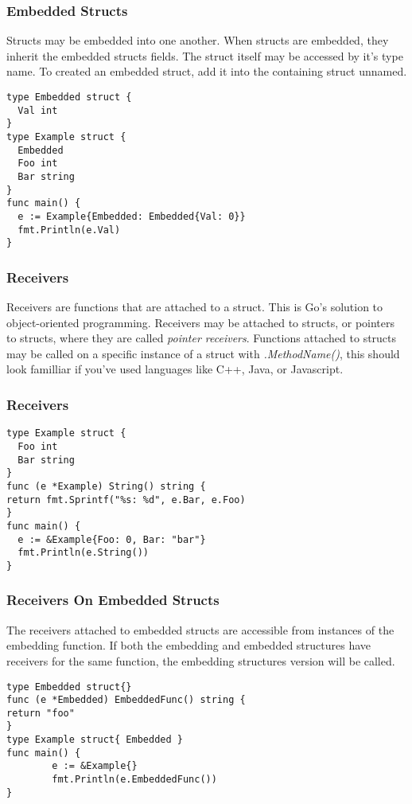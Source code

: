 \documentclass{beamer}
\begin{document}
\begin{frame}[fragile]
  \frametitle{Embedded Structs}
  Structs may be embedded into one another.  When structs are
  embedded, they inherit the embedded structs fields.  The struct
  itself may be accessed by it's type name.  To created an embedded
  struct, add it into the containing struct unnamed.
\begin{lstlisting}[language=Golang]
type Embedded struct {
  Val int
}
type Example struct {
  Embedded
  Foo int
  Bar string
}
func main() {
  e := Example{Embedded: Embedded{Val: 0}}
  fmt.Println(e.Val)
}
\end{lstlisting}
\end{frame}

\begin{frame}
  \frametitle{Receivers}
  Receivers are functions that are attached to a struct.  This is Go's
  solution to object-oriented programming.  Receivers may be attached
  to structs, or pointers to structs, where they are called
  \emph{pointer receivers}.  Functions attached to structs may be
  called on a specific instance of a struct with \emph{.MethodName()},
  this should look familliar if you've used languages like C++, Java,
  or Javascript.
\end{frame}

\begin{frame}[fragile]
  \frametitle{Receivers}
\begin{lstlisting}[language=Golang]
type Example struct {
  Foo int
  Bar string
}
func (e *Example) String() string {
return fmt.Sprintf("%s: %d", e.Bar, e.Foo)
}
func main() {
  e := &Example{Foo: 0, Bar: "bar"}
  fmt.Println(e.String())
}
\end{lstlisting}
\end{frame}

\begin{frame}[fragile]
  \frametitle{Receivers On Embedded Structs}
  The receivers attached to embedded structs are accessible from
  instances of the embedding function.  If both the embedding and
  embedded structures have receivers for the same function, the
  embedding structures version will be called.
\begin{lstlisting}[language=Golang]
type Embedded struct{}
func (e *Embedded) EmbeddedFunc() string {
return "foo"
}
type Example struct{ Embedded }
func main() {
        e := &Example{}
        fmt.Println(e.EmbeddedFunc())
}
\end{lstlisting}
\end{frame}
\end{document}

